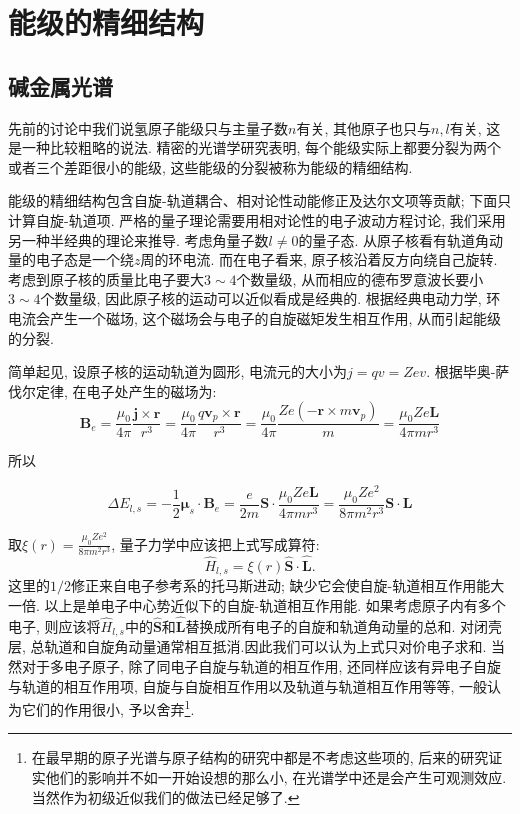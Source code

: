 \section{能级的精细结构}
\subsection{碱金属光谱}
先前的讨论中我们说氢原子能级只与主量子数$n$有关, 其他原子也只与$n, l$有关, 这是一种比较粗略的说法. 精密的光谱学研究表明, 每个能级实际上都要分裂为两个或者三个差距很小的能级, 这些能级的分裂被称为能级的精细结构.

能级的精细结构包含自旋-轨道耦合、相对论性动能修正及达尔文项等贡献; 下面只计算自旋-轨道项. 严格的量子理论需要用相对论性的电子波动方程讨论, 我们采用另一种半经典的理论来推导. 考虑角量子数$l\neq 0$的量子态. 从原子核看有轨道角动量的电子态是一个绕$z$周的环电流. 而在电子看来, 原子核沿着反方向绕自己旋转. 考虑到原子核的质量比电子要大$3\sim4$个数量级, 从而相应的德布罗意波长要小$3\sim4$个数量级, 因此原子核的运动可以近似看成是经典的. 根据经典电动力学, 环电流会产生一个磁场, 这个磁场会与电子的自旋磁矩发生相互作用, 从而引起能级的分裂.

简单起见, 设原子核的运动轨道为圆形, 电流元的大小为$j=qv=Zev$. 根据毕奥-萨伐尔定律, 在电子处产生的磁场为:
\[
\bm{B}_e = \frac{\mu_0}{4\pi} \frac{\bm{j} \times \bm{r}}{r^3}
          = \frac{\mu_0}{4\pi} \frac{q \bm{v}_p \times \bm{r}}{r^3}
          = \frac{\mu_0}{4 \pi} \frac{Z e \left( -\bm{r} \times m \bm{v}_p \right)}{m}
          = \frac{\mu_0 Z e \bm{L}}{4 \pi m r^3}
\]

所以

\[
\Delta E_{l, s} = -\frac12\bm{\mu}_s \cdot \bm{B}_e
               = \frac{e}{2m} \bm{S} \cdot \frac{\mu_0 Z e \bm{L}}{4 \pi m r^3}
               = \frac{\mu_0 Z e^2}{8 \pi m^2 r^3} \bm{S} \cdot \bm{L}
\]

取$\xi(r)=\frac{\mu_0 Z e^2}{8 \pi m^2 r^3}$, 量子力学中应该把上式写成算符:
\[
\hat{H}_{l, s} = \xi(r) \hat{\mathbf{S}} \cdot \hat{\mathbf{L}}.
\]
这里的$1/2$修正来自电子参考系的托马斯进动; 缺少它会使自旋-轨道相互作用能大一倍. 以上是单电子中心势近似下的自旋-轨道相互作用能. 如果考虑原子内有多个电子, 则应该将$\hat{H}_{l, s}$中的$\hat{\mathbf{S}}$和$\hat{\mathbf{L}}$替换成所有电子的自旋和轨道角动量的总和. 对闭壳层, 总轨道和自旋角动量通常相互抵消.因此我们可以认为上式只对价电子求和. 当然对于多电子原子, 除了同电子自旋与轨道的相互作用, 还同样应该有异电子自旋与轨道的相互作用项, 自旋与自旋相互作用以及轨道与轨道相互作用等等, 一般认为它们的作用很小, 予以舍弃\footnote{在最早期的原子光谱与原子结构的研究中都是不考虑这些项的, 后来的研究证实他们的影响并不如一开始设想的那么小, 在光谱学中还是会产生可观测效应. 当然作为初级近似我们的做法已经足够了. }.

